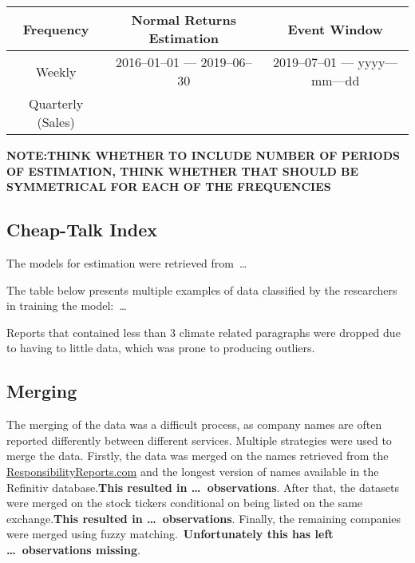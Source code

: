 \documentclass[12pt]{article}
\begin{document}
\begin{table}[!h]
    \label{tab:data_freq}
    \begin{tabular}{ccc}
        \toprule
        Frequency & Normal Returns Estimation & Event Window \\
        \midrule
        Weekly & 2016--01--01 --- 2019--06--30 & 2019--07--01 --- yyyy---mm---dd \\
        Quarterly (Sales) && \\ 
        \bottomrule
    \end{tabular}
    \begin{tablenotes}
        \footnotesize
        \item \textbf{NOTE:\@ THINK WHETHER TO INCLUDE NUMBER OF PERIODS OF ESTIMATION, THINK WHETHER THAT SHOULD BE SYMMETRICAL FOR EACH OF THE FREQUENCIES}
    \end{tablenotes}
\end{table}

\newpage
\normalsize
\raggedright{}

\subsection{Cheap-Talk Index}\label{app:data:cti}

The models for estimation were retrieved from\ \dots

The table below presents multiple examples of data classified by the researchers in training the model:\ \dots 

Reports that contained less than 3 climate related paragraphs were dropped due to having to little data, which was prone to producing outliers.

\subsection{Merging}\label{app:data:merging}

The merging of the data was a difficult process, as company names are often reported differently between different services. Multiple strategies were used to merge the data. Firstly, the data was merged on the names retrieved from the \href{https://responsibilityreports.com}{ResponsibilityReports.com} and the longest version of names available in the Refinitiv database.\@ \textbf{This resulted in \dots\ observations}. After that, the datasets were merged on the stock tickers conditional on being listed on the same exchange.\@ \textbf{This resulted in \dots\ observations}. Finally, the remaining companies were merged using fuzzy matching.\ \textbf{Unfortunately this has left \dots\ observations missing}.
\end{document}
